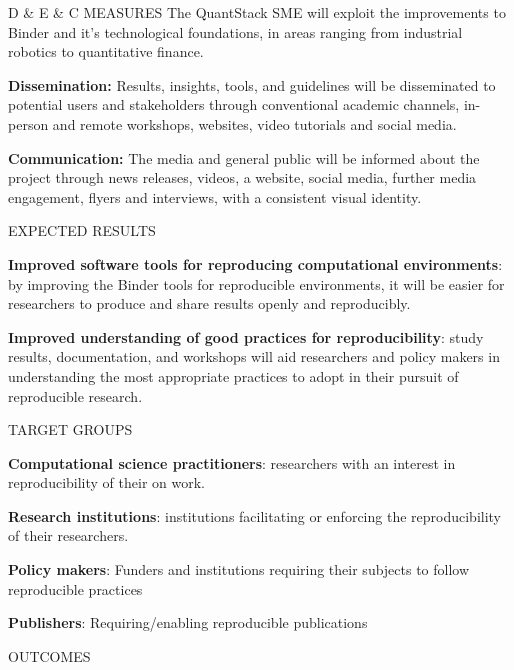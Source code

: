 \begin{multicols}{2}
\begin{summarybox}{D \& E \& C MEASURES}
The QuantStack SME will exploit the improvements to Binder and it's technological foundations, in areas ranging from
industrial robotics to quantitative finance.

\textbf{Dissemination:} Results, insights, tools, and guidelines will
  be disseminated to potential users and stakeholders through conventional
  academic channels, in-person and remote workshops, websites, video tutorials
  and social media.

\textbf{Communication:} The media and general public will be informed
  about the project through news releases, videos, a website, social media,
  further media engagement, flyers and interviews, with a consistent visual
  identity.
\end{summarybox}

\begin{summarybox}{EXPECTED RESULTS}

\textbf{Improved software tools for reproducing computational environments}:
by improving the Binder tools for reproducible environments,
it will be easier for researchers to produce and share results openly and reproducibly.

\textbf{Improved understanding of good practices for reproducibility}: study results, documentation, and workshops will aid researchers and policy makers in understanding the most appropriate practices to adopt in their pursuit of reproducible research.

\end{summarybox}

\begin{summarybox}{TARGET GROUPS}

\textbf{Computational science practitioners}: researchers with an interest in reproducibility of their on work.

\textbf{Research institutions}: institutions facilitating or enforcing the reproducibility of their researchers.

\textbf{Policy makers}: Funders and institutions requiring their subjects to follow reproducible practices

\textbf{Publishers}: Requiring/enabling reproducible publications
\end{summarybox}

\begin{summarybox}{OUTCOMES}


\end{summarybox}
\end{multicols}
